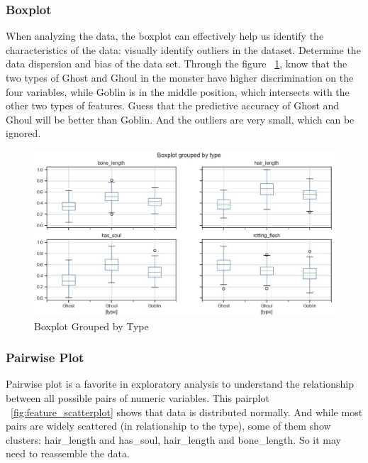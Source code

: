\subsubsection{Boxplot}

 
When analyzing the data, 
the boxplot can effectively 
help us identify the characteristics of the data: 
visually identify outliers in the dataset. 
Determine the data dispersion and 
bias of the data set. 
Through the figure ~\cref{fig:boxplot}, 
know that the two types of Ghost and Ghoul 
in the monster have higher discrimination 
on the four variables, 
while Goblin is in the middle position, 
which intersects with the other two types of features.
Guess that the predictive accuracy of Ghost and Ghoul 
will be better than Goblin.
And the outliers are very small,
which can be ignored.


\begin{figure}[htbp]
	\centering
	\label{fig:boxplot}
	\includegraphics[scale=0.3]{figures/boxplot.eps}
	\caption{Boxplot Grouped by Type}
\end{figure}


\subsubsection{Pairwise Plot} 


Pairwise plot is 
a favorite in exploratory analysis 
to understand the relationship 
between all possible pairs 
of numeric variables. 
This pairplot ~\cref{fig:feature_scatterplot} 
shows that data is distributed normally. 
And while most pairs are widely scattered 
(in relationship to the type), 
some of them show clusters: 
hair_length and has_soul, 
hair_length and bone_length. 
So it may need to reassemble the data.

